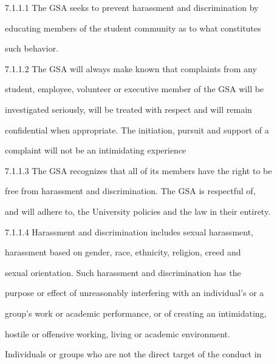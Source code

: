 7.1.1.1  The   GSA   seeks   to   prevent   harassment   and   discrimination   by  

         educating  members of  the student  community  as to what  constitutes  

         such behavior.  



  



7.1.1.2  The   GSA  will   always   make  known   that   complaints   from   any  

         student,  employee, volunteer or executive member of the GSA will be  

         investigated  seriously,  will  be  treated  with  respect  and  will  remain  

         confidential when  appropriate.  The initiation, pursuit and support of a  

         complaint will not be an intimidating experience  



  



7.1.1.3 The  GSA recognizes that all of  its members  have  the  right  to  be   

         free   from harassment  and  discrimination.  The  GSA is  respectful  of,  

         and will adhere to, the University policies and the law in their entirety.  



  



7.1.1.4     Harassment         and     discrimination        includes       sexual     harassment,  

        harassment  based  on  gender,   race,   ethnicity,   religion,   creed   and  

         sexual     orientation.      Such     harassment  and   discrimination   has   the  

        purpose or  effect  of unreasonably interfering with  an individual's or  a  

         group's work or academic performance, or of creating an intimidating,  

        hostile     or   offensive      working,       living    or   academic       environment.  

         Individuals  or  groups  who  are not  the  direct  target  of  the  conduct  in  

